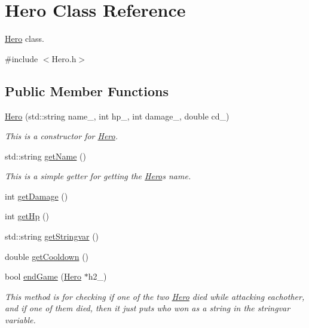 \hypertarget{classHero}{}\section{Hero Class Reference}
\label{classHero}


\hyperlink{classHero}{Hero} class.  




{\ttfamily \#include $<$Hero.\+h$>$}

\subsection*{Public Member Functions}
\begin{DoxyCompactItemize}
\item 
\hyperlink{classHero_a48a41cc569e8a128d8fd027752f699c5}{Hero} (std\+::string name\+\_\+, int hp\+\_\+, int damage\+\_\+, double cd\+\_\+)
\begin{DoxyCompactList}\small\item\em This is a constructor for \hyperlink{classHero}{Hero}. \end{DoxyCompactList}\item 
std\+::string \hyperlink{classHero_ade246d363b9021a7e7aa811bb1410e6d}{get\+Name} ()
\begin{DoxyCompactList}\small\item\em This is a simple getter for getting the \hyperlink{classHero}{Hero}\textquotesingle{}s name. \end{DoxyCompactList}\item 
int \hyperlink{classHero_a4a681c061ac4ce4d1cd22aeb025c8d2e}{get\+Damage} ()
\item 
int \hyperlink{classHero_a7710500513b5197165e3d3c0b6402f07}{get\+Hp} ()
\item 
std\+::string \hyperlink{classHero_a031f8270dcbab7eed51b0dfb99ac62c4}{get\+Stringvar} ()
\item 
double \hyperlink{classHero_a9e675f767e7cccdc090403913cd7d270}{get\+Cooldown} ()
\item 
bool \hyperlink{classHero_a56e321690e3545aeb4fab9d3181d27e9}{end\+Game} (\hyperlink{classHero}{Hero} $\ast$h2\+\_\+)
\begin{DoxyCompactList}\small\item\em This method is for checking if one of the two \hyperlink{classHero}{Hero} died while attacking eachother, and if one of them died, then it just puts who won as a string in the stringvar variable. \end{DoxyCompactList}\item 

\end{DoxyCompactItemize}
